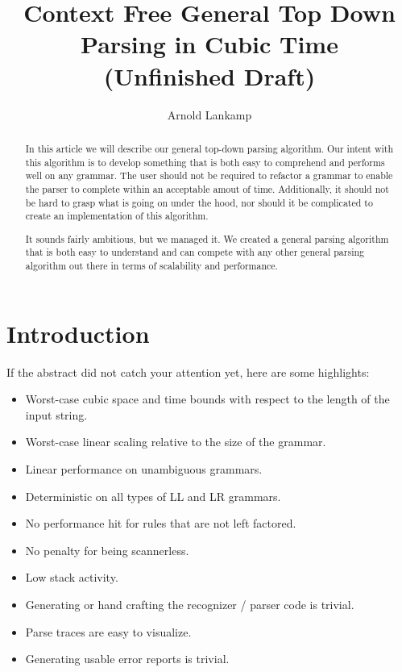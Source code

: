 \documentclass[a4paper,10pt]{article}
\title{Context Free General Top Down Parsing in Cubic Time\\(Unfinished Draft)}
\author{Arnold Lankamp}
\begin{document}
\maketitle

\begin{abstract}

In this article we will describe our general top-down parsing algorithm. Our intent with this algorithm is to develop something that is both easy to comprehend and performs well on any grammar. The user should not be required to refactor a grammar to enable the parser to complete within an acceptable amout of time. Additionally, it should not be hard to grasp what is going on under the hood, nor should it be complicated to create an implementation of this algorithm.

It sounds fairly ambitious, but we managed it. We created a general parsing algorithm that is both easy to understand and can compete with any other general parsing algorithm out there in terms of scalability and performance.

\end{abstract}

\section{Introduction}

If the abstract did not catch your attention yet, here are some highlights:
\begin{itemize}
 \setlength{\itemsep}{0pt}
 \setlength{\parskip}{0pt}
 \setlength{\parsep}{0pt}
 
 \item Worst-case cubic space and time bounds with respect to the length of the input string.
 \item Worst-case linear scaling relative to the size of the grammar.
 \item Linear performance on unambiguous grammars.
 \item Deterministic on all types of LL and LR grammars.
 \item No performance hit for rules that are not left factored.
 \item No penalty for being scannerless.
 \item Low stack activity.
 \item Generating or hand crafting the recognizer / parser code is trivial.
 \item Parse traces are easy to visualize.
 \item Generating usable error reports is trivial.
\end{itemize}
\end{document}
